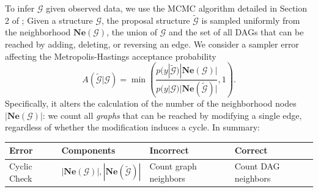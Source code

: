 \documentclass{article}
\begin{document}
To infer $\mathcal{G}$ given observed data, we use the MCMC algorithm detailed in Section 2 of \cite{grzegorczyk_improving_2008}; 
Given a structure $\mathcal{G}$, the proposal structure $\tilde{\mathcal{G}}$ is sampled uniformly from the neighborhood $\mathbf{Ne}(\mathcal{G})$, the union of $\mathcal{G}$ and the set of all DAGs that can be reached by adding, deleting, or reversing an edge. 
We consider a sampler error affecting the Metropolis-Hastings acceptance probability
\begin{equation}
A(\tilde{\mathcal{G}}|\mathcal{G}) = \min{\left(\frac{p(y|\tilde{\mathcal{G}})|\mathbf{Ne}(\mathcal{G})|}{p(y|\mathcal{G})|\mathbf{Ne}(\tilde{\mathcal{G}})|}, 1\right)}. \label{eq:exp_graph_mh}
\end{equation}
Specifically, it alters the calculation of the number of the neighborhood nodes $|\mathbf{Ne}(\mathcal{G})|$: we count all \textit{graphs} that can be reached by modifying a single edge, regardless of whether the modification induces a cycle. In summary:
\begin{center}
    \begin{tabular}{llll}
    Error & Components & Incorrect & Correct \\
    \midrule  
         Cyclic Check & $|\mathbf{Ne}(\mathcal{G})|, |\mathbf{Ne}(\tilde{\mathcal{G}})|$ & Count graph neighbors & Count DAG neighbors \\
    \end{tabular}
\end{center}

\end{document}
